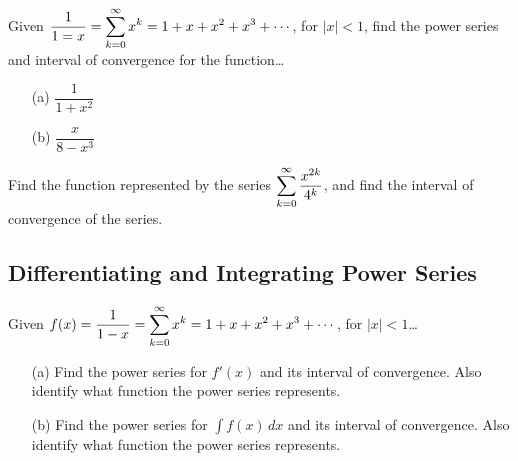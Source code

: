 \documentclass[12pt]{article}
\begin{document}
\Example Given $\dfrac{1}{1=x}=\displaystyle\sum_{k=0}^\infty x^k=1+x+x^2+x^3+\cdots$, for $|x|<1$, find the power series and interval of convergence for the function\dots

\begin{enumerate}
	\item[(a)] $\dfrac{1}{1+x^2}$
	
	\vfill
	
	\item[(b)] $\dfrac{x}{8-x^3}$
	
	\vfill
\end{enumerate}

\Example Find the function represented by the series $\displaystyle\sum_{k=0}^\infty\dfrac{x^{2k}}{4^k}$, and find the interval of convergence of the series.

\vfill

\newpage


\subsection*{Differentiating and Integrating Power Series}


\Example Given $f(x)=\dfrac{1}{1-x}=\displaystyle\sum_{k=0}^\infty x^k=1+x+x^2+x^3+\cdots$, for $|x|<1$\dots

\begin{enumerate}
\item[(a)] Find the power series for $f'(x)$ and its  interval of convergence. Also identify what function the power series represents.

\vfill

\item[(b)] Find the power series for $\int f(x)\,dx$ and its interval of convergence. Also identify what function the power series represents.

\vfill
\end{enumerate}
\end{document}
